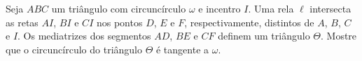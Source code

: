 Seja $ABC$ um triângulo com circuncírculo $\omega$ e incentro $I$.
Uma rela $\ell$ intersecta as retas $AI$, $BI$ e $CI$ nos pontos $D$, $E$ e $F$, respectivamente, distintos de $A$, $B$, $C$ e $I$.
Os mediatrizes dos segmentos $AD$, $BE$ e $CF$ definem um triângulo $\Theta$.
Mostre que o circuncírculo do triângulo $\Theta$ é tangente a $\omega$.
